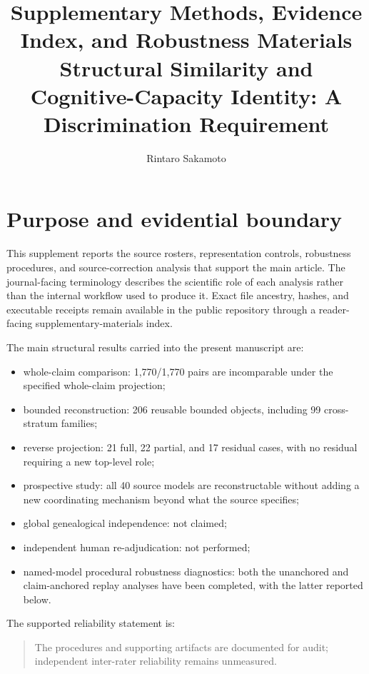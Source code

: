 \documentclass[11pt]{article}
\title{Supplementary Methods, Evidence Index, and Robustness Materials\\
Structural Similarity and Cognitive-Capacity Identity: A Discrimination Requirement}
\author{Rintaro Sakamoto}
\date{}
\begin{document}
\maketitle
\sloppy

\section{Purpose and evidential boundary}

This supplement reports the source rosters, representation controls, robustness procedures, and source-correction analysis that support the main article. The journal-facing terminology describes the scientific role of each analysis rather than the internal workflow used to produce it. Exact file ancestry, hashes, and executable receipts remain available in the public repository through a reader-facing supplementary-materials index.

The main structural results carried into the present manuscript are:
\begin{itemize}[leftmargin=*]
\item whole-claim comparison: 1,770/1,770 pairs are incomparable under the specified whole-claim projection;
\item bounded reconstruction: 206 reusable bounded objects, including 99 cross-stratum families;
\item reverse projection: 21 full, 22 partial, and 17 residual cases, with no residual requiring a new top-level role;
\item prospective study: all 40 source models are reconstructable without adding a new coordinating mechanism beyond what the source specifies;
\item global genealogical independence: not claimed;
\item independent human re-adjudication: not performed;
\item named-model procedural robustness diagnostics: both the unanchored and claim-anchored replay analyses have been completed, with the latter reported below.
\end{itemize}

The supported reliability statement is:

\begin{quote}
The procedures and supporting artifacts are documented for audit; independent inter-rater reliability remains unmeasured.
\end{quote}
\end{document}
